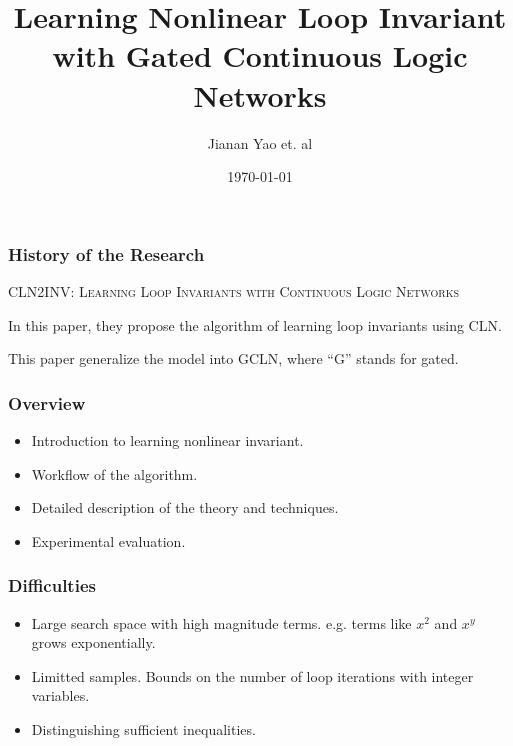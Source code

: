 \documentclass[11pt]{beamer}
\title{Learning Nonlinear Loop Invariant with Gated Continuous Logic Networks}
\date{\today}
\author{Jianan Yao et. al}
\begin{document}
\maketitle

\begin{frame}\frametitle{History of the Research}

\begin{center}
\textsc{CLN2INV: Learning Loop Invariants with Continuous Logic Networks}
\end{center}

In this paper, they propose the algorithm of learning loop invariants using CLN.

This paper generalize the model into GCLN, where ``G'' stands for gated.

\end{frame}
\begin{frame}\frametitle{Overview}
\begin{itemize}
\item Introduction to learning nonlinear invariant.
\item Workflow of the algorithm.
\item Detailed description of the theory and techniques.
\item Experimental evaluation.
\end{itemize}

\end{frame}
\begin{frame}\frametitle{Difficulties}
\begin{itemize}
\item Large search space with high magnitude terms. e.g. terms like $x^2$ and $x^y$ grows exponentially.

\item Limitted samples. Bounds on the number of loop iterations with integer variables.

\item Distinguishing sufficient inequalities.

\end{itemize}

\end{frame}
\end{document}
